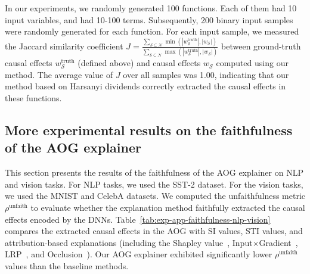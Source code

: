 In our experiments, we randomly generated 100 functions.
Each of them had 10 input variables, and had 10-100 terms.
Subsequently, 200 binary input samples were randomly generated for each function.
For each input sample, we measured the Jaccard similarity coefficient {\small$J=\frac{\sum_{\mathcal{S}\subseteq \mathcal{N}}\min(|w^{\text{truth}}_{\mathcal{S}}|, |w_{\mathcal{S}}|)}{\sum_{\mathcal{S}\subseteq \mathcal{N}}\max(|w^{\text{truth}}_{\mathcal{S}}|, |w_{\mathcal{S}}|)}$} between ground-truth causal effects {\small$w^{\text{truth}}_{\mathcal{S}}$} (defined above) and causal effects {\small$w_{\mathcal{S}}$} computed using our method.
The average value of {\small$J$} over all samples was 1.00, indicating that our method based on Harsanyi dividends correctly extracted the causal effects in these functions.


\subsection{More experimental results on the faithfulness of the AOG explainer}
This section presents the results of the faithfulness of the AOG explainer on NLP and vision tasks.
For NLP tasks, we used the SST-2 dataset.
For the vision tasks, we used the MNIST and CelebA datasets.
We computed the unfaithfulness metric {\small$\rho^{\text{unfaith}}$} to evaluate whether the explanation method faithfully extracted the   causal effects encoded by the DNNs.
Table~\ref{tab:exp-app-faithfulness-nlp-vision} compares the extracted causal effects in the AOG with SI values, STI values, and attribution-based explanations (including the Shapley value~\cite{shapley1953value}, Input{\small$\times$}Gradient~\cite{shrikumar2016not}, LRP~\cite{bach2015pixel}, and Occlusion~\cite{zeiler2014visualizing}).
Our AOG explainer exhibited significantly lower {\small$\rho^{\text{unfaith}}$} values than the baseline methods.

\begin{table}[htbp]
\centering
\caption{Unfaithfulness ({\small$\downarrow$}) of different explanation methods on the NLP and vision tasks.}
\label{tab:exp-app-faithfulness-nlp-vision}
\end{table}



